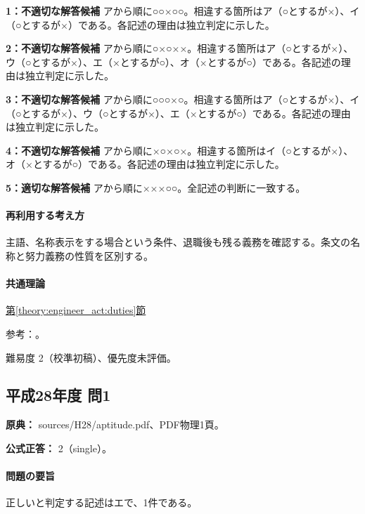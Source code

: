 \noindent\textbf{1：不適切な解答候補} アから順に○○×○○。相違する箇所はア（○とするが×）、イ（○とするが×）である。各記述の理由は独立判定に示した。\par

\noindent\textbf{2：不適切な解答候補} アから順に○×○××。相違する箇所はア（○とするが×）、ウ（○とするが×）、エ（×とするが○）、オ（×とするが○）である。各記述の理由は独立判定に示した。\par

\noindent\textbf{3：不適切な解答候補} アから順に○○○×○。相違する箇所はア（○とするが×）、イ（○とするが×）、ウ（○とするが×）、エ（×とするが○）である。各記述の理由は独立判定に示した。\par

\noindent\textbf{4：不適切な解答候補} アから順に×○×○×。相違する箇所はイ（○とするが×）、オ（×とするが○）である。各記述の理由は独立判定に示した。\par

\noindent\textbf{5：適切な解答候補} アから順に×××○○。全記述の判断に一致する。\par

\paragraph{再利用する考え方} 主語、名称表示をする場合という条件、退職後も残る義務を確認する。条文の名称と努力義務の性質を区別する。

\paragraph{共通理論} \hyperref[theory:engineer_act:duties]{第\ref*{theory:engineer_act:duties}節}

\par 参考：\cite{engineer_act_current}。

\par 難易度 2（校準初稿）、優先度未評価。

\subsection{平成28年度 問1}
\label{q:h28-reg-apt-01}

\noindent\textbf{原典：} sources/H28/aptitude.pdf、PDF物理1頁。

\textbf{公式正答：} 2（single）。

\paragraph{問題の要旨} 正しいと判定する記述はエで、1件である。

